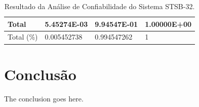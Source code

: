 \documentclass[lettersize,journal]{IEEEtran}
\begin{document}
\begin{table}[!ht]
	\caption{Resultado da Análise de Confiabilidade do Sistema STSB-32.}
	\label{tabela: Resultado_Confiabilidade}
	\centering
	\begin{tabularx}{.5\textwidth}{|Y|Y|Y|Y|}
		\hline
		Total & 5.45274E-03 & 9.94547E-01 & 1.00000E+00 \\ \hline
		Total (\%) & 0.005452738 & 0.994547262 & 1 \\ \hline
	\end{tabularx}
\end{table}


\section{Conclusão}
The conclusion goes here.


 


\end{document}
